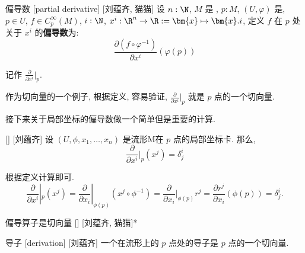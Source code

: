 \documentclass[UTF8]{ctexart}
\begin{document}
        \begin{dfn}
            {偏导数}
            [partial derivative]
            [刘蕴齐, 猫猫]
            设 \(n:\N\), \(M\) 是 , \(p:M\), \((U, \varphi)\) 是, \(p\in U\), \(f\in C_p^{\infty}(M)\), \(i:\N\), \(x^i:\R^n\to\R:=\bm{x}\mapsto\bm{x}.i\), 定义 \(f\) 在 \(p\) 处关于 \(x^i\) 的\textbf{偏导数}为: 
            \[\frac{\partial(f \circ \varphi^{-1})}{\partial x^i}(\varphi(p))\]

            记作 \(\frac{\partial}{\partial x^i}|_p\). 
        \end{dfn}

        \begin{rmk}
            []
            作为切向量的一个例子, 根据定义, 容易验证,  \(\frac{\partial}{\partial x^i} |_p\) 就是 \(p\) 点的一个切向量. 
        \end{rmk}

        接下来关于局部坐标的偏导数做一个简单但是重要的计算. 
        
        \begin{ppt}
            []
            {}
            []
            [刘蕴齐]
            设 \((U, \phi, x_1, \dots, x_n)\) 是流形M在 \(p\) 点的局部坐标卡. 那么, 
            \[\frac{\partial}{\partial x^i} |_p (x^j) = \delta^i_{j}\]
        \end{ppt}

        \begin{prf}
            根据定义计算即可. 
            \[
            \frac{\partial}{\partial x^i} |_p (x^j)
            =
            \frac{\partial}{\partial x_i}|_{\phi(p)} (x^j \circ \phi^{-1} )
            =
            \frac{\partial}{\partial x_i}|_{\phi(p)} r^j
            =
            \frac{\partial r^j}{\partial x_i}(\phi(p))
            =
            \delta^i_{j}.
            \]
        \end{prf}

        \begin{ppt}
            []
            {偏导算子是切向量}
            []
            [刘蕴齐, 猫猫]*
        \end{ppt}
        
        \begin{dfn}
            []
            {导子}
            [derivation]
            [刘蕴齐]
            一个在流形上的 \(p\) 点处的导子是 \(p\) 点的一个切向量. 
        \end{dfn}
        
\end{document}
